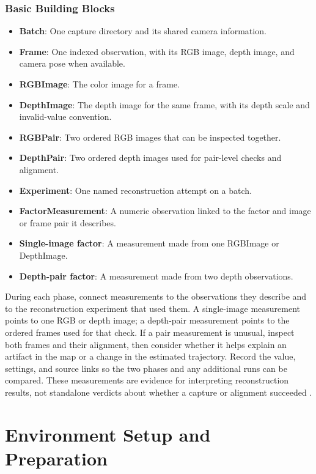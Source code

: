 \documentclass[11pt]{article}
\begin{document}
\subsubsection{Basic Building Blocks}
\begin{itemize}
\item \textbf{Batch}: One capture directory and its shared camera information.
\item \textbf{Frame}: One indexed observation, with its RGB image, depth image, and camera pose when available.
\item \textbf{RGBImage}: The color image for a frame.
\item \textbf{DepthImage}: The depth image for the same frame, with its depth scale and invalid-value convention.
\item \textbf{RGBPair}: Two ordered RGB images that can be inspected together.
\item \textbf{DepthPair}: Two ordered depth images used for pair-level checks and alignment.
\item \textbf{Experiment}: One named reconstruction attempt on a batch.
\item \textbf{FactorMeasurement}: A numeric observation linked to the factor and image or frame pair it describes.
\item \textbf{Single-image factor}: A measurement made from one RGBImage or DepthImage.
\item \textbf{Depth-pair factor}: A measurement made from two depth observations.
\end{itemize}

During each phase, connect measurements to the observations they describe and to the reconstruction experiment that used them. A single-image measurement points to one RGB or depth image; a depth-pair measurement points to the ordered frames used for that check. If a pair measurement is unusual, inspect both frames and their alignment, then consider whether it helps explain an artifact in the map or a change in the estimated trajectory. Record the value, settings, and source links so the two phases and any additional runs can be compared. These measurements are evidence for interpreting reconstruction results, not standalone verdicts about whether a capture or alignment succeeded \cite{chen1992object}.

\section{Environment Setup and Preparation}
\end{document}
